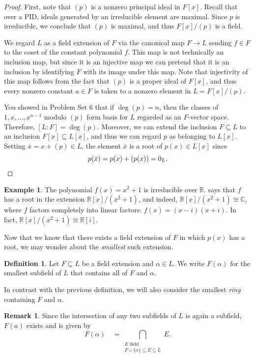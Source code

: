 \documentclass[12pt]{report}
\numberwithin{equation}{section}
\numberwithin{theorem}{chapter}
\theoremstyle{definition}
\newtheorem{definition}[theorem]{Definition}
\newtheorem{example}[theorem]{Example}
\newtheorem*{basic properties}{Basic Properties}
\newtheorem*{Important Remark}{Important Remark}
\newtheorem{remark}[theorem]{Remark}
\newcommand{\R}{\mathbb{R}}
\newcommand{\C}{\mathbb{C}}
\begin{document}
 
\begin{proof}
First, note that $(p)$ is a nonzero principal ideal in $F[x]$. Recall that over a PID, ideals generated by an irreducible element are maximal. Since $p$ is irreducible, we conclude that $(p)$ is maximal, and thus $F[x]/(p)$ is a field. 

We regard $L$ as a field extension of $F$ via the canonical map $F \to L$ sending $f \in F$ to the coset of the constant polynomial $f$. This map is not technically an inclusion map, but since it is an injective map we can pretend that it is an inclusion by identifying $F$ with its image under this map. Note that injectivity of this map follows from the fact that $(p)$ is a proper ideal of $F[x]$, and thus every nonzero constant $a \in F$ is taken to a nonzero element in $L = F[x]/(p)$. 

You showed in Problem Set 6 that if $\deg(p) = n$, then the classes of $1, x, \dots, x^{n-1}$ modulo $(p)$ form basis for $L$ regarded as an $F$-vector space. Therefore, $[L:F]=\deg(p)$. Moreover, we can extend the inclusion $F\subseteq L$ to an inclusion $F[x]\subseteq L[x]$, and thus we can regard $p$ as belonging to $L[x]$. Setting $\overline{x}=x+(p)\in L$, the element $\overline{x}$ is a root of $p(x)\in L[x]$ since 
$$p(\bar{x})=p(x)+ (p(x))=0_L.\qedhere$$
\end{proof}


\begin{example}
	The polynomial $f(x) = x^2+1$ is irreducible over $\R$.  says that $f$ has a root in the extension $\R[x]/(x^2+1)$, and indeed, $\R[x]/(x^2+1) \cong \C$, where $f$ factors completely into linear factors: $f(x) = (x-i)(x+i)$. In fact, $\R[x]/(x^2+1) \cong \R[i]$.
\end{example}

Now that we know that there exists a field extension of $F$ in which $p(x)$ has a root, we may wonder about the {\em smallest} such extension.

\begin{definition}
Let $F \subseteq L$ be a field extension and $\alpha \in L$. We write $F(\alpha)$ for the smallest subfield of $L$ that contains all of $F$ and $\alpha$.
\end{definition}

In contrast with the previous definition, we will also consider the smallest \emph{ring} containing $F$ and $\alpha$.


\begin{remark}
Since the intersection of any two subfields of $L$ is again a subfield, $F(a)$ exists and is given by
$$F(\alpha) \quad = \bigcap_{\substack{E \text{ field } \\ F \cup \{ \alpha \}  \subseteq E   \subseteq  L}} E.$$
\end{remark}
\end{document}
